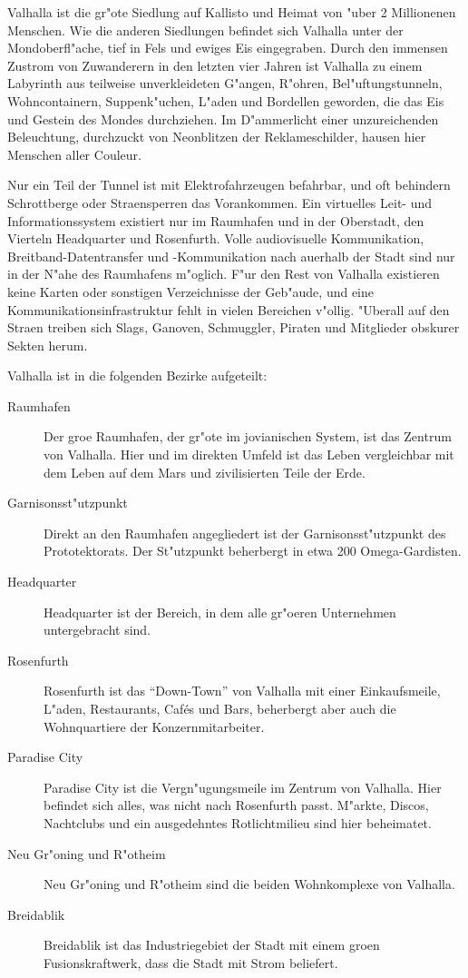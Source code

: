 Valhalla ist die gr"o\3te Siedlung auf Kallisto und Heimat von "uber 2 Millionenen Menschen. Wie die anderen Siedlungen befindet sich Valhalla unter der Mondoberfl"ache, tief in Fels und ewiges Eis eingegraben. Durch den immensen Zustrom von Zuwanderern in den letzten vier Jahren ist Valhalla zu einem Labyrinth aus teilweise unverkleideten G"angen, R"ohren, Bel"uftungstunneln, Wohncontainern, Suppenk"uchen, L"aden und Bordellen geworden, die das Eis und Gestein des Mondes durchziehen. Im D"ammerlicht einer unzureichenden Beleuchtung, durchzuckt von Neonblitzen der Reklameschilder, hausen hier Menschen aller Couleur.

Nur ein Teil der Tunnel ist mit Elektrofahrzeugen befahrbar, und oft behindern Schrottberge oder Stra\3ensperren das Vorankommen. Ein virtuelles Leit- und Informationssystem existiert nur im Raumhafen und in der Oberstadt, den Vierteln Headquarter und Rosenfurth. Volle audiovisuelle Kommunikation, Breitband-Datentransfer und -Kommunikation nach au\3erhalb der Stadt sind nur in der N"ahe des Raumhafens m"oglich. F"ur den Rest von Valhalla existieren keine Karten oder sonstigen Verzeichnisse der Geb"aude, und eine Kommunikationsinfrastruktur fehlt in vielen Bereichen v"ollig. "Uberall auf den Stra\3en treiben sich Slags, Ganoven, Schmuggler, Piraten und Mitglieder obskurer Sekten herum.


Valhalla ist in die folgenden Bezirke aufgeteilt:

\begin{description}
    \item[Raumhafen] Der gro\3e Raumhafen, der gr"o\3te im jovianischen System, ist das Zentrum von Valhalla. Hier und im direkten Umfeld 
        ist das Leben vergleichbar mit dem Leben auf dem Mars und zivilisierten Teile der Erde.
    \item [Garnisonsst"utzpunkt] Direkt an den Raumhafen angegliedert ist der Garnisonsst"utzpunkt des Prototektorats. Der St"utzpunkt 
        beherbergt in etwa 200 Omega-Gardisten. 
    \item [Headquarter] Headquarter ist der Bereich, in dem alle gr"o\3eren Unternehmen untergebracht sind.
    \item [Rosenfurth] Rosenfurth ist das ``Down-Town'' von Valhalla mit einer Einkaufsmeile, L"aden, Restaurants, Caf\'es und Bars, 
        beherbergt aber auch die Wohnquartiere der Konzernmitarbeiter.
    \item [Paradise City] Paradise City ist die Vergn"ugungsmeile im Zentrum von Valhalla. Hier befindet sich alles, was nicht nach 
        Rosenfurth passt. M"arkte, Discos, Nachtclubs und ein ausgedehntes Rotlichtmilieu sind hier beheimatet.
    \item [Neu Gr"oning und R"otheim] Neu Gr"oning und R"otheim sind die beiden Wohnkomplexe von Valhalla.
    \item [Breidablik] Breidablik ist das Industriegebiet der Stadt mit einem gro\3en Fusionskraftwerk, dass die Stadt mit Strom beliefert.
\end{description}

